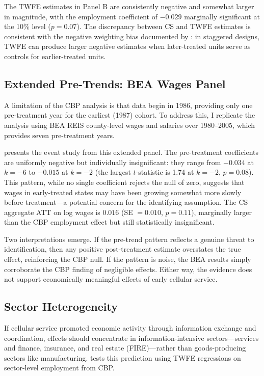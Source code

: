 \documentclass[12pt]{article}
\begin{document}
The TWFE estimates in Panel B are consistently negative and somewhat larger in magnitude, with the employment coefficient of $-0.029$ marginally significant at the 10\% level ($p = 0.07$). The discrepancy between CS and TWFE estimates is consistent with the negative weighting bias documented by \citet{goodman2021}: in staggered designs, TWFE can produce larger negative estimates when later-treated units serve as controls for earlier-treated units.



\subsection{Extended Pre-Trends: BEA Wages Panel}

A limitation of the CBP analysis is that data begin in 1986, providing only one pre-treatment year for the earliest (1987) cohort. To address this, I replicate the analysis using BEA REIS county-level wages and salaries over 1980--2005, which provides seven pre-treatment years.

 presents the event study from this extended panel. The pre-treatment coefficients are uniformly negative but individually insignificant: they range from $-0.034$ at $k = -6$ to $-0.015$ at $k = -2$ (the largest $t$-statistic is 1.74 at $k = -2$, $p = 0.08$). This pattern, while no single coefficient rejects the null of zero, suggests that wages in early-treated states may have been growing somewhat more slowly before treatment---a potential concern for the identifying assumption. The CS aggregate ATT on log wages is $0.016$ (SE $= 0.010$, $p = 0.11$), marginally larger than the CBP employment effect but still statistically insignificant.

Two interpretations emerge. If the pre-trend pattern reflects a genuine threat to identification, then any positive post-treatment estimate overstates the true effect, reinforcing the CBP null. If the pattern is noise, the BEA results simply corroborate the CBP finding of negligible effects. Either way, the evidence does not support economically meaningful effects of early cellular service.



\subsection{Sector Heterogeneity}

If cellular service promoted economic activity through information exchange and coordination, effects should concentrate in information-intensive sectors---services and finance, insurance, and real estate (FIRE)---rather than goods-producing sectors like manufacturing.  tests this prediction using TWFE regressions on sector-level employment from CBP.
\end{document}
